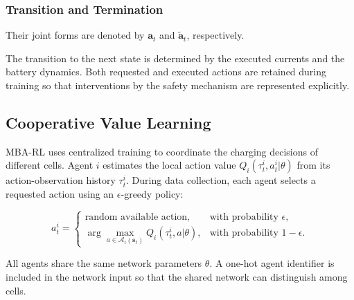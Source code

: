 \subsubsection{Transition and Termination}

 Their joint forms are denoted by $\mathbf{a}_t$ and $\tilde{\mathbf{a}}_t$, respectively.

The transition to the next state is determined by the executed currents and the battery dynamics.  Both requested and executed actions are retained during training so that interventions by the safety mechanism are represented explicitly.

\subsection{Cooperative Value Learning}

MBA-RL uses centralized training to coordinate the charging decisions of different cells. Agent $i$ estimates the local action value $Q_i(\tau_t^i,a_t^i|\theta)$ from its action-observation history $\tau_t^i$. During data collection, each agent selects a requested action using an $\epsilon$-greedy policy:

\begin{equation}
\label{epsilon-greedy}
a_t^i =
\begin{cases}
\text{random available action},
& \text{with probability }\epsilon,\\
\displaystyle
\arg\max_{a\in\mathcal{A}_i(\mathbf{s}_t)}
Q_i(\tau_t^i,a|\theta),
& \text{with probability }1-\epsilon.
\end{cases}
\end{equation}

All agents share the same network parameters $\theta$. A one-hot agent identifier is included in the network input so that the shared network can distinguish among cells.



